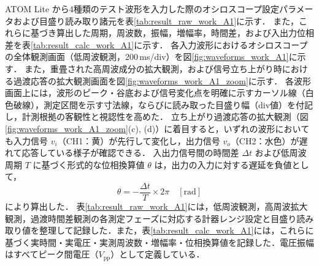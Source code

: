 ATOM Lite から4種類のテスト波形を入力した際のオシロスコープ設定パラメータおよび目盛り読み取り諸元を表\ref{tab:result_raw_work_A1}に示す．
また，これらに基づき算出した周期，周波数，振幅，増幅率，時間差，および入出力位相差を表\ref{tab:result_calc_work_A1}に示す．
各入力波形におけるオシロスコープの全体観測画面（低周波観測，200\,ms/div）を図\ref{fig:waveforms_work_A1}に示す．
また，重畳された高周波成分の拡大観測，および信号立ち上がり時における過渡応答の拡大観測画面を図\ref{fig:waveforms_work_A1_zoom}に示す．
各波形画面上には，波形のピーク・谷底および信号変化点を明確に示すカーソル線（白色破線），測定区間を示す寸法線，ならびに読み取った目盛り幅（div値）を付記し，計測根拠の客観性と視認性を高めた．
立ち上がり過渡応答の拡大観測（図\ref{fig:waveforms_work_A1_zoom}(c), (d)）に着目すると，いずれの波形においても入力信号 $v_i$（CH1：黄）が先行して変化し，出力信号 $v_o$（CH2：水色）が遅れて応答している様子が確認できる．
入出力信号間の時間差 $\Delta t$ および低周波周期 $T$ に基づく形式的な位相換算値 $\theta$ は，出力の入力に対する遅延を負値として，
\begin{equation}
  \theta = -\frac{\Delta t}{T} \times 2\pi \quad [\mathrm{rad}]
  \label{eq:phase_calc_result}
\end{equation}
により算出した．
表\ref{tab:result_raw_work_A1}には，低周波観測，高周波拡大観測，過渡時間差観測の各測定フェーズに対応する計器レンジ設定と目盛り読み取り値を整理して記録した．また，表\ref{tab:result_calc_work_A1}には，これらに基づく実時間・実電圧・実測周波数・増幅率・位相換算値を記録した．電圧振幅はすべてピーク間電圧（$V_{\mathrm{pp}}$）として定義している．

